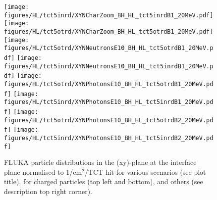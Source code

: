 \begin{figure}
  \begin{center}
    \texttt{[image: figures/HL/tct5inrd/XYNCharZoom\_BH\_HL\_tct5inrdB1\_20MeV.pdf]}
    \texttt{[image: figures/HL/tct5otrd/XYNCharZoom\_BH\_HL\_tct5otrdB1\_20MeV.pdf]} 
    \texttt{[image: figures/HL/tct5otrd/XYNNeutronsE10\_BH\_HL\_tct5otrdB1\_20MeV.pdf]}
    \texttt{[image: figures/HL/tct5inrd/XYNNeutronsE10\_BH\_HL\_tct5inrdB1\_20MeV.pdf]}
    \texttt{[image: figures/HL/tct5otrd/XYNPhotonsE10\_BH\_HL\_tct5otrdB1\_20MeV.pdf]}
    \texttt{[image: figures/HL/tct5inrd/XYNPhotonsE10\_BH\_HL\_tct5inrdB1\_20MeV.pdf]}
    \texttt{[image: figures/HL/tct5otrd/XYNPhotonsE10\_BH\_HL\_tct5otrdB2\_20MeV.pdf]}
    \texttt{[image: figures/HL/tct5inrd/XYNPhotonsE10\_BH\_HL\_tct5inrdB2\_20MeV.pdf]}

\end{center}
\vspace{-0.6cm}
 \caption{FLUKA particle distributions in the (xy)-plane at the interface plane normalised to 1/cm$^{2}$/TCT hit for various scenarios (see plot title), for charged particles (top left and bottom), and others (see description top right corner).
  \label{fig:XYN}}
\end{figure}

